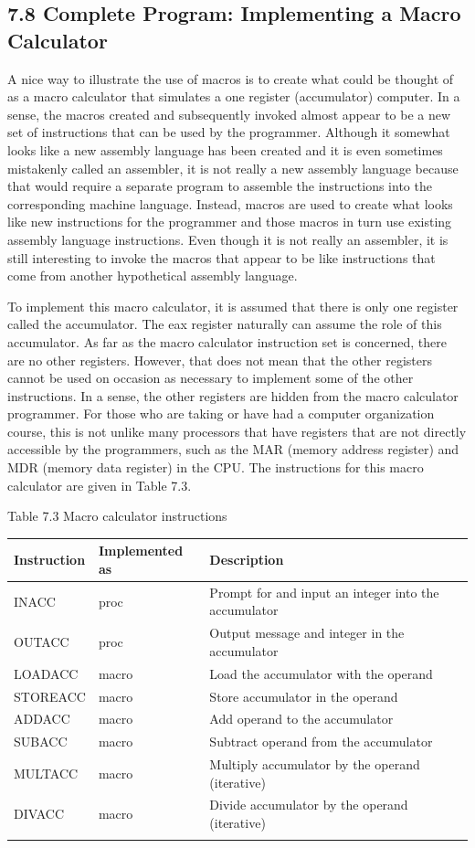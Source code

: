 \documentclass[10pt]{book}
\begin{document}
\subsection*{7.8 Complete Program: Implementing a Macro Calculator}
A nice way to illustrate the use of macros is to create what could be thought of as a macro calculator that simulates a one register (accumulator) computer. In a sense, the macros created and subsequently invoked almost appear to be a new set of instructions that can be used by the programmer. Although it somewhat looks like a new assembly language has been created and it is even sometimes mistakenly called an assembler, it is not really a new assembly language because that would require a separate program to assemble the instructions into the corresponding machine language. Instead, macros are used to create what looks like new instructions for the programmer and those macros in turn use existing assembly language instructions. Even though it is not really an assembler, it is still interesting to invoke the macros that appear to be like instructions that come from another hypothetical assembly language.

To implement this macro calculator, it is assumed that there is only one register called the accumulator. The eax register naturally can assume the role of this accumulator. As far as the macro calculator instruction set is concerned, there are no other registers. However, that does not mean that the other registers cannot be used on occasion as necessary to implement some of the other instructions. In a sense, the other registers are hidden from the macro calculator programmer. For those who are taking or have had a computer organization course, this is not unlike many processors that have registers that are not directly accessible by the programmers, such as the MAR (memory address register) and MDR (memory data register) in the CPU. The instructions for this macro calculator are given in Table 7.3.

Table 7.3 Macro calculator instructions


\begin{center}
\begin{tabular}{lll|}
\hline
Instruction & Implemented as & Description \\
\hline
INACC & proc & Prompt for and input an integer into the accumulator \\
OUTACC & proc & Output message and integer in the accumulator \\
LOADACC & macro & Load the accumulator with the operand \\
STOREACC & macro & Store accumulator in the operand \\
ADDACC & macro & Add operand to the accumulator \\
SUBACC & macro & Subtract operand from the accumulator \\
MULTACC & macro & Multiply accumulator by the operand (iterative) \\
DIVACC & macro & Divide accumulator by the operand (iterative) \\
 &  &  \\
\end{tabular}
\end{center}
\end{document}
